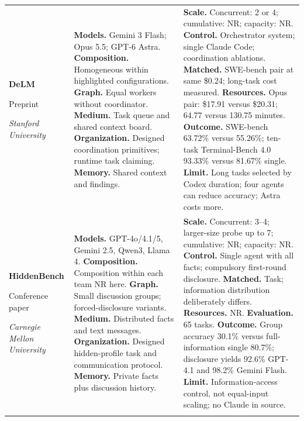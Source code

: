 \begin{longtable}{@{}>{\raggedright\arraybackslash}p{}>{\raggedright\arraybackslash}p{}>{\raggedright\arraybackslash}p{}@{}}
\textbf{DeLM}\par \citep{delm-shared-context}\par Preprint\par\emph{Stanford University} & \textbf{Models.} Gemini 3 Flash; Opus 5.5; GPT-6 Astra. \textbf{Composition.} Homogeneous within highlighted configurations. \textbf{Graph.} Equal workers without coordinator. \textbf{Medium.} Task queue and shared context board. \textbf{Organization.} Designed coordination primitives; runtime task claiming. \textbf{Memory.} Shared context and findings. & \textbf{Scale.} Concurrent: 2 or 4; cumulative: NR; capacity: NR. \textbf{Control.} Orchestrator system; single Claude Code; coordination ablations. \textbf{Matched.} SWE-bench pair at same \$0.24; long-task cost measured. \textbf{Resources.} Opus pair: \$17.91 versus \$20.31; 64.77 versus 130.75 minutes. \textbf{Outcome.} SWE-bench 63.72\% versus 55.26\%; ten-task Terminal-Bench 4.0 93.33\% versus 81.67\% single. \textbf{Limit.} Long tasks selected by Codex duration; four agents can reduce accuracy; Astra costs more. \\ \addlinespace[5pt]
\textbf{HiddenBench}\par \citep{hiddenbench}\par Conference paper\par\emph{Carnegie Mellon University} & \textbf{Models.} GPT-4o/4.1/5, Gemini 2.5, Qwen3, Llama 4. \textbf{Composition.} Composition within each team NR here. \textbf{Graph.} Small discussion groups; forced-disclosure variants. \textbf{Medium.} Distributed facts and text messages. \textbf{Organization.} Designed hidden-profile task and communication protocol. \textbf{Memory.} Private facts plus discussion history. & \textbf{Scale.} Concurrent: 3--4; larger-size probe up to 7; cumulative: NR; capacity: NR. \textbf{Control.} Single agent with all facts; compulsory first-round disclosure. \textbf{Matched.} Task; information distribution deliberately differs. \textbf{Resources.} NR. \textbf{Evaluation.} 65 tasks. \textbf{Outcome.} Group accuracy 30.1\% versus full-information single 80.7\%; disclosure yields 92.6\% GPT-4.1 and 98.2\% Gemini Flash. \textbf{Limit.} Information-access control, not equal-input scaling; no Claude in source. \\ \addlinespace[5pt]

\end{longtable}
